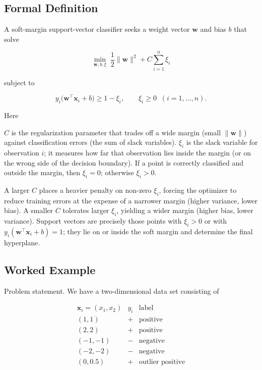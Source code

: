\documentclass[12pt, a4paper]{article}
\begin{document}
\subsection{Formal Definition}
A soft-margin support-vector classifier seeks a weight vector \( \mathbf{w} \) and bias \( b \) that solve  

\[
\min_{\mathbf{w},b,\xi}\;\frac{1}{2}\|\mathbf{w}\|^{2}+C\sum_{i=1}^{n}\xi_{i}
\]

subject to  

\[
y_{i}\bigl(\mathbf{w}^{\top}\mathbf{x}_{i}+b\bigr)\ge 1-\xi_{i},\qquad 
\xi_{i}\ge 0\;\;(i=1,\dots ,n).
\]

Here  

 \( C \) is the regularization parameter that trades off a wide margin (small \( \|\mathbf{w}\| \)) against classification errors (the sum of slack variables).  
 \( \xi_{i} \) is the slack variable for observation \( i \); it measures how far that observation lies inside the margin (or on the wrong side of the decision boundary).  
If a point is correctly classified and outside the margin, then \( \xi_{i}=0 \); otherwise \( \xi_{i}>0 \).  

A larger \( C \) places a heavier penalty on non-zero \( \xi_{i} \), forcing the optimizer to reduce training errors at the expense of a narrower margin (higher variance, lower bias).  
A smaller \( C \) tolerates larger \( \xi_{i} \), yielding a wider margin (higher bias, lower variance).  
Support vectors are precisely those points with \( \xi_{i}>0 \) or with \( y_{i}(\mathbf{w}^{\top}\mathbf{x}_{i}+b)=1 \); they lie on or inside the soft margin and determine the final hyperplane.

\subsection{Worked Example}
Problem statement.  
We have a two-dimensional data set consisting of  

\[
\begin{array}{c|c|c}
\mathbf{x}_{i}=(x_{1},x_{2}) & y_{i} & \text{label}\\ \hline
(1,1)   & + & \text{positive}\\
(2,2)   & + & \text{positive}\\
(-1,-1) & - & \text{negative}\\
(-2,-2) & - & \text{negative}\\
(0,0.5) & + & \text{outlier positive}
\end{array}
\]
\end{document}
